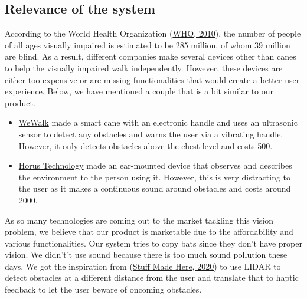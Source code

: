\documentclass{article}
\begin{document}
\subsection{Relevance of the system}
According to the World Health Organization (\href{https://www.who.int/blindness/publications/globaldata/en/#:~:text=Globally\%20the\%20number\%20of\%20people,blindness\%20is\%20cataract\%20(51\%25).}{WHO, 2010}), the number of people of all ages visually impaired is estimated to be 285 million, of whom 39 million are blind. As a result, different companies make several devices other than canes to help the visually impaired walk independently. However, these devices are either too expensive or are missing functionalities that would create a better user experience. Below, we have mentioned a couple that is a bit similar to our product.
\begin{itemize}
\item \href{https://wewalk.io/en/}{WeWalk} made a smart cane with an electronic handle and uses an ultrasonic sensor to detect any obstacles and warns the user via a vibrating handle. However, it only detects obstacles above the chest level and costs 500.


\item \href{https://italianinnovationday.weebly.com/horus-technology.html}{Horus Technology} made an ear-mounted device that observes and describes the environment to the person using it. However, this is very distracting to the user as it makes a continuous sound around obstacles and costs around 2000.
\end{itemize}
As so many technologies are coming out to the market tackling this vision problem, we believe that our product is marketable due to the affordability and various functionalities.
\newline
Our system tries to copy bats since they don’t have proper vision. We didn't’t use sound because there is too much sound pollution these days. We got the inspiration from (\href{https://www.youtube.com/watch?app=desktop&v=8Au47gnXs0w}{Stuff Made Here, 2020}) to use LIDAR to detect obstacles at a different distance from the user and translate that to haptic feedback to let the user beware of oncoming obstacles.
\end{document}
